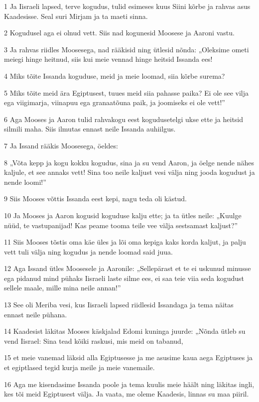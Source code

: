\par 1 Ja Iisraeli lapsed, terve kogudus, tulid esimeses kuus Siini kõrbe ja rahvas asus Kaadesisse. Seal suri Mirjam ja ta maeti sinna.
\par 2 Kogudusel aga ei olnud vett. Siis nad kogunesid Moosese ja Aaroni vastu.
\par 3 Ja rahvas riidles Moosesega, nad rääkisid ning ütlesid nõnda: „Oleksime ometi meiegi hinge heitnud, siis kui meie vennad hinge heitsid Issanda ees!
\par 4 Miks tõite Issanda koguduse, meid ja meie loomad, siia kõrbe surema?
\par 5 Miks tõite meid ära Egiptusest, tuues meid siia pahasse paika? Ei ole see vilja ega viigimarja, viinapuu ega granaatõuna paik, ja joomiseks ei ole vett!”
\par 6 Aga Mooses ja Aaron tulid rahvakogu eest kogudusetelgi ukse ette ja heitsid silmili maha. Siis ilmutas ennast neile Issanda auhiilgus.
\par 7 Ja Issand rääkis Moosesega, öeldes:
\par 8 „Võta kepp ja kogu kokku kogudus, sina ja su vend Aaron, ja öelge nende nähes kaljule, et see annaks vett! Sina too neile kaljust vesi välja ning jooda kogudust ja nende loomi!”
\par 9 Siis Mooses võttis Issanda eest kepi, nagu teda oli kästud.
\par 10 Ja Mooses ja Aaron kogusid koguduse kalju ette; ja ta ütles neile: „Kuulge nüüd, te vastupanijad! Kas peame tooma teile vee välja sestsamast kaljust?”
\par 11 Siis Mooses tõstis oma käe üles ja lõi oma kepiga kaks korda kaljut, ja palju vett tuli välja ning kogudus ja nende loomad said juua.
\par 12 Aga Issand ütles Moosesele ja Aaronile: „Sellepärast et te ei uskunud minusse ega pidanud mind pühaks Iisraeli laste silme ees, ei saa teie viia seda kogudust sellele maale, mille mina neile annan!”
\par 13 See oli Meriba vesi, kus Iisraeli lapsed riidlesid Issandaga ja tema näitas ennast neile pühana.
\par 14 Kaadesist läkitas Mooses käskjalad Edomi kuninga juurde: „Nõnda ütleb su vend Iisrael: Sina tead kõiki raskusi, mis meid on tabanud,
\par 15 et meie vanemad läksid alla Egiptusesse ja me asusime kaua aega Egiptuses ja et egiptlased tegid kurja meile ja meie vanemaile.
\par 16 Aga me kisendasime Issanda poole ja tema kuulis meie häält ning läkitas ingli, kes tõi meid Egiptusest välja. Ja vaata, me oleme Kaadesis, linnas su maa piiril.
